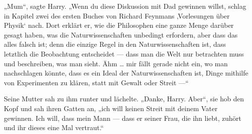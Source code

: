 „Mum“, sagte Harry.
„Wenn du diese Diskussion mit Dad gewinnen willst, schlag in Kapitel zwei des ersten Buches von Richard Feynmans ‚Vorlesungen über Physik‘ nach. Dort erklärt er, wie die Philosophen eine ganze Menge darüber gesagt haben, was die Naturwissenschaften unbedingt erfordern, aber dass das alles falsch ist; denn die einzige Regel in den Naturwissenschaften ist, dass letztlich die Beobachtung entscheidet — dass man die Welt nur betrachten muss und beschreiben, was man sieht. Ähm … mir fällt gerade nicht ein, wo man nachschlagen könnte, dass es ein Ideal der Naturwissenschaften ist, Dinge mithilfe von Experimenten zu klären, statt mit Gewalt oder Streit —“ %

Seine Mutter sah zu ihm runter und lächelte.
„Danke, Harry. Aber“, sie hob den Kopf und sah ihren Gatten an, „ich will keinen Streit mit deinem Vater gewinnen. Ich will, dass mein Mann — dass er seiner Frau, die ihn liebt, zuhört und ihr dieses eine Mal vertraut.“

